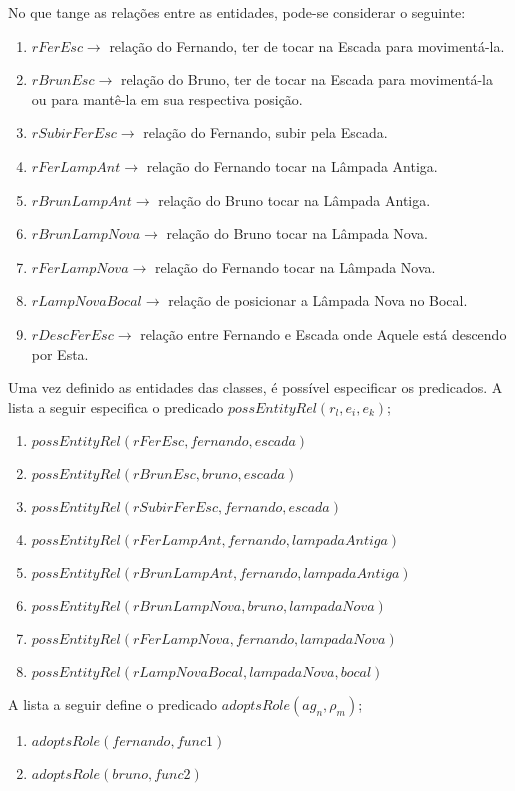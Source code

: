 No que tange as relações entre as entidades, pode-se considerar o seguinte: 

\begin{enumerate}
	\item $rFerEsc \to$ relação do Fernando, ter de tocar na Escada para movimentá-la. 
	\item $rBrunEsc \to$ relação do Bruno, ter de tocar na Escada para movimentá-la ou para mantê-la em sua respectiva posição.
	\item $rSubirFerEsc \to$ relação do Fernando, subir pela Escada.
	\item $rFerLampAnt \to$ relação do Fernando tocar na Lâmpada Antiga. 
	\item $rBrunLampAnt \to$ relação do Bruno tocar na Lâmpada Antiga.
	\item $rBrunLampNova \to$ relação do Bruno tocar na Lâmpada Nova.
	\item $rFerLampNova \to$ relação do Fernando tocar na Lâmpada Nova.
	\item $rLampNovaBocal \to$  relação de posicionar a Lâmpada Nova no Bocal. 	
	\item $rDescFerEsc \to$ relação entre Fernando e Escada onde Aquele está descendo por Esta.
\end{enumerate}


Uma vez definido as entidades das classes, é possível especificar os predicados. A lista a seguir especifica o predicado $possEntityRel(r_l,e_i,e_k)$;

\begin{enumerate}
	\item $possEntityRel(rFerEsc,fernando,escada)$
	\item $possEntityRel(rBrunEsc,bruno,escada)$
	\item $possEntityRel(rSubirFerEsc,fernando,escada)$
	\item $possEntityRel(rFerLampAnt,fernando,lampadaAntiga)$
	\item $possEntityRel(rBrunLampAnt,fernando,lampadaAntiga)$
	\item $possEntityRel(rBrunLampNova,bruno,lampadaNova)$
	\item $possEntityRel(rFerLampNova,fernando,lampadaNova)$
	\item $possEntityRel(rLampNovaBocal,lampadaNova,bocal)$
\end{enumerate}

A lista a seguir define o predicado $adoptsRole(ag_n,\rho_m)$;

\begin{enumerate}
	\item $adoptsRole(fernando,func1)$
	\item $adoptsRole(bruno,func2)$
\end{enumerate}

